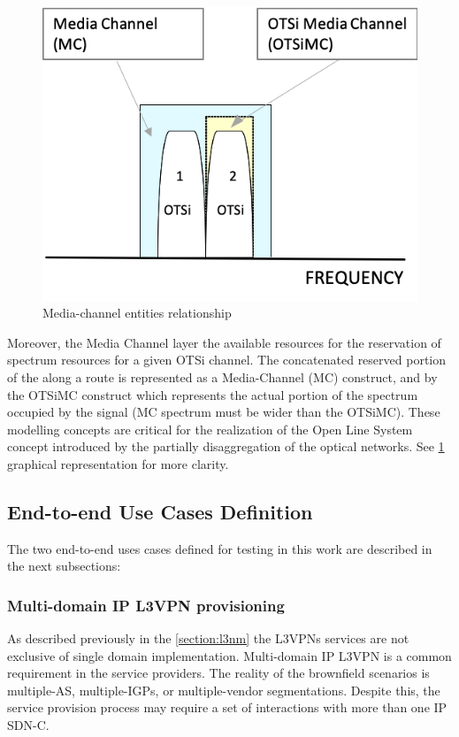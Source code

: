 \documentclass[a4paper,fleqn]{cas-dc}
\begin{document}
\begin{figure}
	\centering
		\includegraphics[scale=0.75]{figs/Media_channel.png}
	\caption{Media-channel entities relationship}
	\label{FIG:Media_channel}
\end{figure}

Moreover, the Media Channel layer the available resources for the reservation of  spectrum resources for a given OTSi channel. The concatenated reserved portion of the along a route is represented as a Media-Channel (MC) construct, and by the OTSiMC construct which represents the actual portion of the spectrum occupied by the signal (MC spectrum must be wider than the OTSiMC). These modelling concepts are critical for the realization of the Open Line System concept introduced by the partially disaggregation of the optical networks. See \cref{FIG:Media_channel} graphical representation for more clarity.


\subsection{End-to-end Use Cases Definition}
The two end-to-end uses cases defined for testing in this work are described in the next subsections:

\subsubsection{Multi-domain IP L3VPN provisioning}
\label{section:muli-l3nm}

As described previously in the \cref{section:l3nm} the L3VPNs services are not exclusive of single domain implementation. Multi-domain IP L3VPN is a common requirement in the service providers. The reality of the brownfield scenarios is multiple-AS, multiple-IGPs, or multiple-vendor segmentations. Despite this, the service provision process may require a set of interactions with more than one IP SDN-C. 
\end{document}
